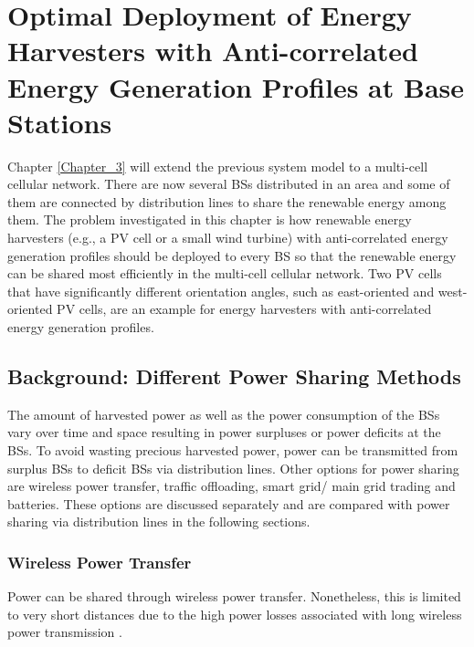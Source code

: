 \clearpage
\chapter{Optimal Deployment of Energy Harvesters with Anti-correlated Energy Generation Profiles at Base Stations\label{Chapter_3}}

Chapter \ref{Chapter_3} will extend the previous system model to a multi-cell cellular network.
There are now several BSs distributed in an area and some of them are connected by distribution lines to share the renewable energy among them. The problem investigated in this chapter is how renewable energy harvesters (e.g., a PV cell or a small wind turbine) with anti-correlated energy generation profiles should be deployed to every BS so that the renewable energy can be shared most efficiently in the multi-cell cellular network. Two PV cells that have significantly different orientation angles, such as east-oriented and west-oriented PV cells, are an example for energy harvesters with anti-correlated energy generation profiles. 







\section{Background: Different Power Sharing Methods}
The amount of harvested power as well as the power consumption of the BSs vary over time and space resulting in power surpluses or power deficits at the BSs. To avoid wasting precious harvested power, power can be transmitted from surplus BSs to deficit BSs via distribution lines. Other options for power sharing are wireless power transfer, traffic offloading, smart grid/ main grid trading and batteries. These options are discussed separately and are compared with power sharing via distribution lines in the following sections.

\subsection{Wireless Power Transfer}
Power can be shared through wireless power transfer. Nonetheless, this is limited to very short distances due to the high power losses associated with long wireless power transmission \cite{7437420}.

